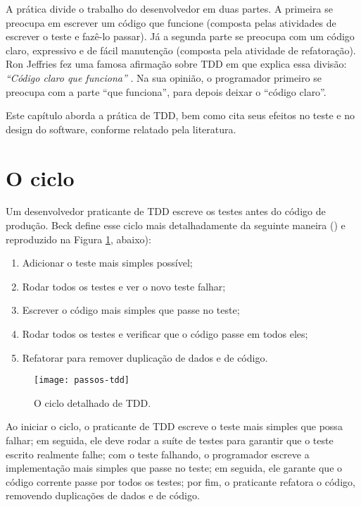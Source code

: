 A prática divide o trabalho do desenvolvedor em duas partes.
A primeira se preocupa em escrever um código que funcione (composta pelas
atividades de escrever o teste e fazê-lo passar). Já a segunda parte se preocupa
com um código claro, expressivo e de fácil manutenção (composta pela atividade
de refatoração). Ron Jeffries fez uma famosa afirmação sobre TDD em que explica
essa divisão: \textit{``Código claro que funciona''} \cite{TDDByExample}. Na
sua opinião, o programador primeiro se preocupa com a parte ``que funciona'', 
para depois deixar o ``código claro''.

Este capítulo aborda a prática de TDD, bem como cita
seus efeitos no teste e no design do software, conforme relatado pela
literatura.

\section{O ciclo}

Um desenvolvedor praticante de TDD escreve os testes antes do código de
produção. Beck define esse ciclo mais detalhadamente da seguinte maneira
()\cite{TDDByExample} e reproduzido na Figura \ref{fig:passos-tdd}, abaixo):

\begin{enumerate}
	\item Adicionar o teste mais simples possível; 
	\item Rodar todos os testes e ver o novo teste falhar; 
	\item Escrever o código mais simples que passe no teste; 
	\item Rodar todos os testes e verificar que o código passe em todos eles; 
	\item Refatorar para remover duplicação de dados e de código.
\end{enumerate}

\begin{figure}
  \centering
  \texttt{[image: passos-tdd]}
  \caption{O ciclo detalhado de TDD.}
  \label{fig:passos-tdd}
\end{figure}

Ao iniciar o ciclo, o praticante de TDD escreve o teste mais simples que
possa falhar; em seguida, ele deve rodar a suíte de testes para 
garantir que o teste escrito realmente falhe; 
com o teste falhando, o programador escreve a
implementação mais simples que passe no teste; em
seguida, ele garante que o código corrente passe por todos os testes; por fim, o praticante
refatora o código, removendo duplicações de dados e de código.

